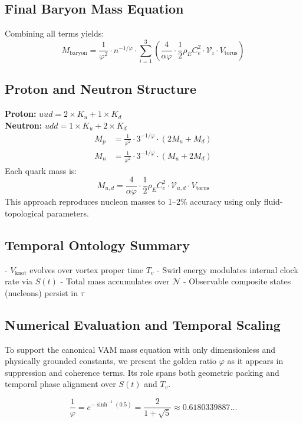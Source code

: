 \subsection{Final Baryon Mass Equation}
Combining all terms yields:
\[
\boxed{
M_{\text{baryon}} = \frac{1}{\varphi^2} \cdot n^{-1/\varphi} \cdot \sum_{i=1}^{3} \left( \frac{4}{\alpha \varphi} \cdot \frac{1}{2} \rho_{\scriptscriptstyle\boldsymbol\!E}C_e^2 \cdot \mathcal{V}_i \cdot V_{\text{torus}} \right)
}
\]

\subsection{Proton and Neutron Structure}
\textbf{Proton:} $uud = 2\times K_u + 1\times K_d$ \\
\textbf{Neutron:} $udd = 1\times K_u + 2\times K_d$
\[
\begin{aligned}
M_p &= \frac{1}{\varphi^2} \cdot 3^{-1/\varphi} \cdot (2M_u + M_d) \\
M_n &= \frac{1}{\varphi^2} \cdot 3^{-1/\varphi} \cdot (M_u + 2M_d)
\end{aligned}
\]
Each quark mass is:
\[
M_{u,d} = \frac{4}{\alpha \varphi} \cdot \frac{1}{2} \rho_{\scriptscriptstyle\boldsymbol\!E}C_e^2 \cdot \mathcal{V}_{u,d} \cdot V_{\text{torus}}
\]
This approach reproduces nucleon masses to 1–2\% accuracy using only fluid-topological parameters.

\subsection*{Temporal Ontology Summary}
- $V_{\text{knot}}$ evolves over vortex proper time $T_v$
- Swirl energy modulates internal clock rate via $S(t)$
- Total mass accumulates over $\mathcal{N}$
- Observable composite states (nucleons) persist in $\tau$


\subsection{Numerical Evaluation and Temporal Scaling}

To support the canonical VAM mass equation with only dimensionless and physically grounded constants, we present the golden ratio $\varphi$ as it appears in suppression and coherence terms. Its role spans both geometric packing and temporal phase alignment over $S(t)$ and $T_v$.

\[
\boxed{
\frac{1}{\varphi} = e^{-\sinh^{-1}(0.5)} = \frac{2}{1 + \sqrt{5}} \approx 0.6180339887\ldots
}
\]

